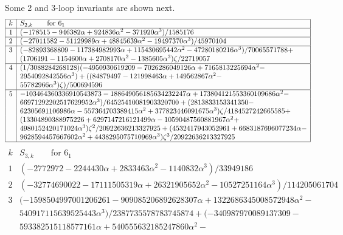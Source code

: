\documentclass[12pt]{amsart}
\theoremstyle{definition}
\def\a{\alpha}
\begin{document}
Some 2 and 3-loop invariants are shown next. 
{\tiny
$$
\begin{array}{|c|l|} \hline
k & S_{2,k} \qquad \text{for $6_1$} \\ \hline
1 & (-178515 - 946382 \a + 924836 \a^2 - 371920 \a^3)/1585176 \\ \hline
2 & (-27011582 - 51129989 \a + 48845639 \a^2 - 19497370 \a^3)/45970104 \\ \hline
3 & (-82893368809 - 117384982993 \a + 115430695442 \a^2 - 
  47280180216 \a^3)/70065571788 + 
\\ & (1706191 - 1154600 \a + 
    2708170 \a^2 - 1385605 \a^3) \zeta/22719057 \\ \hline
4 & (1/3088284268128)(-4950930619209 - 7026286049126 \a + 
   7165813225694 \a^2 - 
\\ &
   2954092842556 \a^3) + ((84879497 - 121998463 \a + 149562867 \a^2 - 
\\ &
    55782966 \a^3) \zeta)/500694596 \\ \hline
5 & -103464360336910543873 - 188649056185634232247 \a + 
    173804121553360109686 \a^2 -
\\ &
 66971292202517629952 \a^3)/
  64525410081903320700 + (2813833153341350 - 
\\ & 
62305691106986 \a - 
      557364703389415 \a^2 + 377823446091675 \a^3) \zeta/
  4184527242665585 + 
\\ & 
(13304890388975226 + 6297147216121499 \a - 
      10590487560881967 \a^2 + 
\\ & 
4980152420171024 \a^3) \zeta^2/
  20922636213327925 + (4532417943052961 + 6683187696077234 \a - 
\\ &
      9628594457667602 \a^2 + 4438295075710969 \a^3) \zeta^3/
  20922636213327925 \\ \hline
\end{array}
$$
$$
\begin{array}{|c|l|} \hline
k & S_{3,k} \qquad \text{for $6_1$} \\ \hline
1 & (-2772972 - 2244430 \a + 2833463 \a^2 - 1140832 \a^3)/33949186 \\ \hline
2 & (-32774690022 - 17111505319 \a + 26321905652 \a^2 - 
 10527251164 \a^3)/114205061704 \\ \hline
3 & (-1598504997001206261 - 909085206892628307 \a + 
    1322686345008572948 \a^2 - 
\\ & 
540917115639525443 \a^3)/
  2387735578783745874 + (-340987970089137309 - 
\\ &      593382515118577161 \a + 540555632185247860 \a^2 - 

\end{array}$$}
\end{document}
